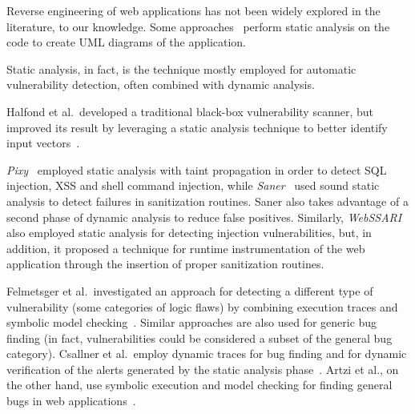 %
%
%
%

Reverse engineering of web applications has not been widely explored
in the literature, to our knowledge. Some approaches~\cite{di02:ware} perform static analysis on the code to create UML
diagrams of the application.

Static analysis, in fact, is the technique mostly employed for automatic
vulnerability detection, often combined with dynamic analysis.

Halfond et al.\ developed a traditional black-box vulnerability
scanner, but improved its result by leveraging a static analysis technique to
better identify input vectors~\cite{halfond09:penetration}.

\emph{Pixy}~\cite{jovanovic10:static} employed static analysis with
taint propagation in order to detect SQL injection, XSS and shell command
injection, while \emph{Saner}~\cite{balzarotti08:saner} used sound
static analysis to detect failures in sanitization routines. Saner
also takes advantage of a second phase of dynamic analysis to reduce
false positives. Similarly, \emph{WebSSARI}~\cite{huang04:securing}
also employed static analysis for detecting injection vulnerabilities,
but, in addition, it proposed a technique for runtime
instrumentation of the web application through the insertion of proper
sanitization routines.

Felmetsger et al.\ investigated an approach for detecting a different type of
vulnerability (some categories of logic flaws) by combining
execution traces and symbolic model checking~\cite{felmetsger10:logic}. Similar
approaches are also used for generic bug finding (in fact, vulnerabilities
could be considered a subset of the general bug category). Csallner et
al.\ employ dynamic traces for bug finding and for dynamic verification of the
alerts generated by the static analysis phase~\cite{csallner08:dsd}. Artzi et
al., on the other hand, use symbolic execution and model checking for finding
general bugs in web applications~\cite{artzi10:finding}.

